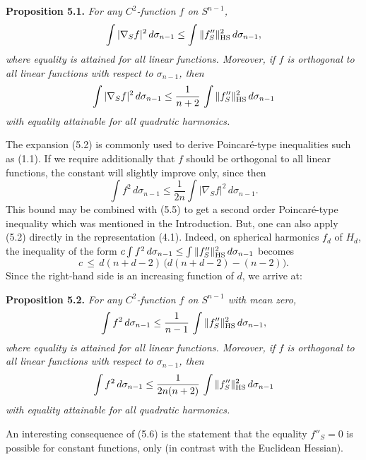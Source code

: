 \documentclass[reqno,12pt]{amsart}
\theoremstyle{plain}
\begin{document}
\vskip5mm
{\bf Proposition 5.1.} {\it For any $C^2$-function $f$ on $S^{n-1}$,
$$
\int |\nabla_S f|^2\,d\sigma_{n-1} \leq
\int \|f''_S\|_{{\rm HS}}^2\,d\sigma_{n-1},
$$
where equality is attained for all linear functions. Moreover, if $f$ 
is orthogonal to all linear functions with respect to $\sigma_{n-1}$, 
then 
\begin{equation}
\int |\nabla_S f|^2\,d\sigma_{n-1} \leq \frac{1}{n+2}\,
\int \|f''_S\|_{{\rm HS}}^2\,d\sigma_{n-1}
\end{equation}
with equality attainable for all quadratic harmonics.
}

\vskip5mm
The expansion (5.2) is commonly used to derive Poincar\'e-type inequalities
such as (1.1). If we require additionally that $f$ should be orthogonal 
to all linear functions, the constant will slightly improve only, since then
$$
\int f^2\,d\sigma_{n-1} \leq \frac{1}{2n} \int |\nabla_S f|^2\,d\sigma_{n-1}.
$$
This bound may be combined with (5.5) to get a second order Poincar\'e-type
inequality which was mentioned in the Introduction. But, one can also apply 
(5.2) directly in the representation (4.1). Indeed, on 
spherical harmonics $f_d$ of $H_d$, the inequality of the form
$
c\int f^2\,d\sigma_{n-1} \leq \int \|f''_S\|_{{\rm HS}}^2\,d\sigma_{n-1}
$
becomes
$$
c \, \leq \, d(n+d-2)\,\big(d(n+d-2) - (n-2)\big).
$$
Since the right-hand side is an increasing function of $d$, we arrive at:

\vskip5mm
{\bf Proposition 5.2.} {\it For any $C^2$-function $f$ on $S^{n-1}$ with
mean zero,
\begin{equation}
\int f^2\,d\sigma_{n-1} \leq \frac{1}{n-1}\,
\int \|f''_S\|_{{\rm HS}}^2\,d\sigma_{n-1},
\end{equation}
where equality is attained for all linear functions. Moreover, if $f$ 
is orthogonal to all linear functions with respect to $\sigma_{n-1}$, 
then 
\begin{equation}
\int f^2\,d\sigma_{n-1} \leq \frac{1}{2n(n+2)}\,
\int \|f''_S\|_{{\rm HS}}^2\,d\sigma_{n-1}
\end{equation}
with equality attainable for all quadratic harmonics.
}

\vskip5mm
An interesting consequence of (5.6) is the statement that the equality 
$f''_S = 0$ is possible for constant functions, only (in contrast with the
Euclidean Hessian).
\end{document}
